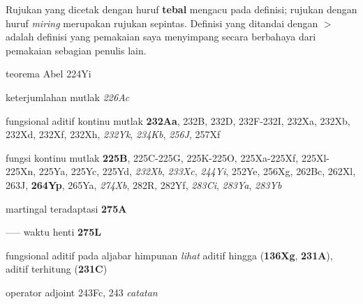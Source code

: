 \indexmedskip


Rujukan yang dicetak dengan huruf {\bf tebal} mengacu pada definisi;
rujukan dengan huruf {\it miring} merupakan rujukan sepintas.
Definisi yang ditandai dengan $\pmb{>}$ adalah definisi yang pemakaian saya
menyimpang secara berbahaya dari pemakaian sebagian penulis lain.

\indexmedskip



 teorema Abel 224Yi




 keterjumlahan mutlak {\it 226Ac}


 fungsional aditif kontinu mutlak {\bf 232Aa}, 232B, 232D, 232F-232I, 232Xa, 232Xb, 232Xd, 232Xf, 232Xh, {\it 232Yk}, {\it 234Kb}, {\it 256J}, 257Xf



fungsi kontinu mutlak {\bf 225B}, 225C-225G, 225K-225O, 225Xa-225Xf, 225Xl-225Xn, 225Ya, 225Yc, 225Yd, {\it 232Xb}, {\it 233Xc}, {\it 244Yi}, 252Ye, 256Xg, 262Bc, 262Xl, 263J, {\bf 264Yp}, 265Ya, {\it 274Xb}, 282R, 282Yf, {\it 283Ci}, {\it 283Ya}, {\it 283Yb}



























 martingal teradaptasi {\bf 275A}


----- waktu henti {\bf 275L}


 fungsional aditif pada aljabar himpunan {\it lihat} aditif hingga ({\bf 136Xg}, {\bf 231A}), aditif terhitung ({\bf 231C})




















 operator adjoint 243Fc, 243 {\it catatan}










